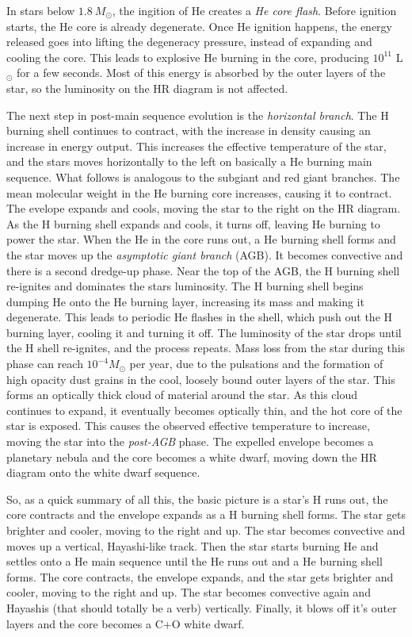 In stars below $1.8\ M_{\odot}$, the ingition of He creates a \emph{He core flash}.  Before 
ignition starts, the He core is already degenerate.  Once He ignition happens, the energy released 
goes into lifting the degeneracy pressure, instead of expanding and cooling the core.  This leads 
to explosive He burning in the core, producing $10^{11}$ L$_{\odot}$ for a few seconds.  Most of 
this energy is absorbed by the outer layers of the star, so the luminosity on the HR diagram is 
not affected.  

The next step in post-main sequence evolution is the \emph{horizontal branch}.  The H burning 
shell continues to contract, with the increase in density causing an increase in energy output.  
This increases the effective temperature of the star, and the stars moves horizontally to the left 
on basically a He burning main sequence.  What follows is analogous to the subgiant and red giant 
branches.  The mean molecular weight in the He burning core increases, causing it to contract.  
The evelope expands and cools, moving the star to the right on the HR diagram.  As the 
H burning shell expands and cools, it turns off, leaving He burning to power the star.  
When the He in the core runs out, a He burning shell forms and the star moves up the 
\emph{asymptotic giant branch} (AGB).  It becomes convective and there is a second dredge-up 
phase.  Near the top of the AGB, the H burning shell re-ignites and dominates the stars 
luminosity.  The H burning shell begins dumping He onto the He burning layer, increasing its mass 
and making it degenerate.  This leads to periodic He flashes in the shell, which push out the 
H burning layer, cooling it and turning it off.  The luminosity of the star drops until the H 
shell re-ignites, and the process repeats.  Mass loss from the star during this phase can 
reach $10^{-4} M_{\odot}$ per year, due to the pulsations and the formation of high opacity dust 
grains in the cool, loosely bound outer layers of the star.  This forms an optically thick cloud 
of material around the star.  As this cloud continues to expand, it eventually becomes optically 
thin, and the hot core of the star is exposed.  This causes the observed effective temperature 
to increase, moving the star into the \emph{post-AGB} phase.  The expelled envelope becomes a 
planetary nebula and the core becomes a white dwarf, moving down the HR diagram onto the white 
dwarf sequence.  

So, as a quick summary of all this, the basic picture is a star's H runs out, the core 
contracts and the envelope expands as a H burning shell forms.  The star gets brighter and cooler, 
moving to the right and up.  The star becomes convective and moves up a vertical, Hayashi-like 
track.  Then the star starts burning He and settles onto a He main sequence until the He runs out 
and a He burning shell forms.  The core contracts, the envelope expands, and the star gets brighter 
and cooler, moving to the right and up.  The star becomes convective again and Hayashis (that 
should totally be a verb) vertically.  Finally, it blows off it's outer layers and the core 
becomes a C+O white dwarf.

